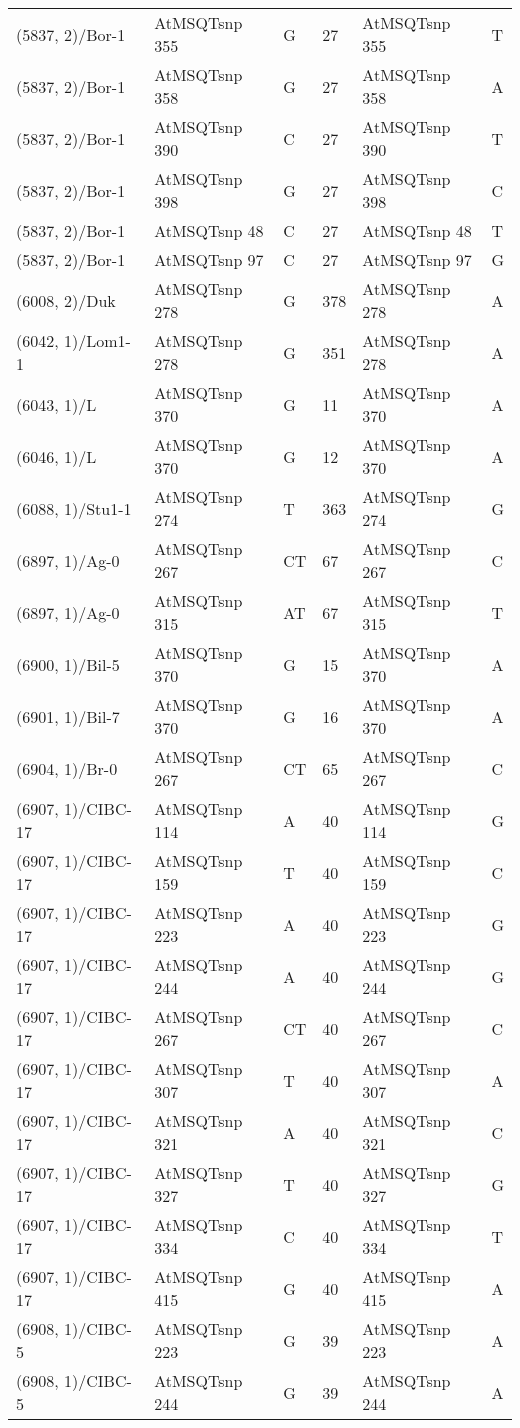\begin{center}
\begin{longtable}{|l|l|l|l|l|l|}
(5837, 2)/Bor-1&AtMSQTsnp 355&G&27&AtMSQTsnp 355&T\\
(5837, 2)/Bor-1&AtMSQTsnp 358&G&27&AtMSQTsnp 358&A\\
(5837, 2)/Bor-1&AtMSQTsnp 390&C&27&AtMSQTsnp 390&T\\
(5837, 2)/Bor-1&AtMSQTsnp 398&G&27&AtMSQTsnp 398&C\\
(5837, 2)/Bor-1&AtMSQTsnp 48&C&27&AtMSQTsnp 48&T\\
(5837, 2)/Bor-1&AtMSQTsnp 97&C&27&AtMSQTsnp 97&G\\
(6008, 2)/Duk&AtMSQTsnp 278&G&378&AtMSQTsnp 278&A\\
(6042, 1)/Lom1-1&AtMSQTsnp 278&G&351&AtMSQTsnp 278&A\\
(6043, 1)/L&AtMSQTsnp 370&G&11&AtMSQTsnp 370&A\\
(6046, 1)/L&AtMSQTsnp 370&G&12&AtMSQTsnp 370&A\\
(6088, 1)/Stu1-1&AtMSQTsnp 274&T&363&AtMSQTsnp 274&G\\
(6897, 1)/Ag-0&AtMSQTsnp 267&CT&67&AtMSQTsnp 267&C\\
(6897, 1)/Ag-0&AtMSQTsnp 315&AT&67&AtMSQTsnp 315&T\\
(6900, 1)/Bil-5&AtMSQTsnp 370&G&15&AtMSQTsnp 370&A\\
(6901, 1)/Bil-7&AtMSQTsnp 370&G&16&AtMSQTsnp 370&A\\
(6904, 1)/Br-0&AtMSQTsnp 267&CT&65&AtMSQTsnp 267&C\\
(6907, 1)/CIBC-17&AtMSQTsnp 114&A&40&AtMSQTsnp 114&G\\
(6907, 1)/CIBC-17&AtMSQTsnp 159&T&40&AtMSQTsnp 159&C\\
(6907, 1)/CIBC-17&AtMSQTsnp 223&A&40&AtMSQTsnp 223&G\\
(6907, 1)/CIBC-17&AtMSQTsnp 244&A&40&AtMSQTsnp 244&G\\
(6907, 1)/CIBC-17&AtMSQTsnp 267&CT&40&AtMSQTsnp 267&C\\
(6907, 1)/CIBC-17&AtMSQTsnp 307&T&40&AtMSQTsnp 307&A\\
(6907, 1)/CIBC-17&AtMSQTsnp 321&A&40&AtMSQTsnp 321&C\\
(6907, 1)/CIBC-17&AtMSQTsnp 327&T&40&AtMSQTsnp 327&G\\
(6907, 1)/CIBC-17&AtMSQTsnp 334&C&40&AtMSQTsnp 334&T\\
(6907, 1)/CIBC-17&AtMSQTsnp 415&G&40&AtMSQTsnp 415&A\\
(6908, 1)/CIBC-5&AtMSQTsnp 223&G&39&AtMSQTsnp 223&A\\
(6908, 1)/CIBC-5&AtMSQTsnp 244&G&39&AtMSQTsnp 244&A\\

\end{longtable}
\end{center}
